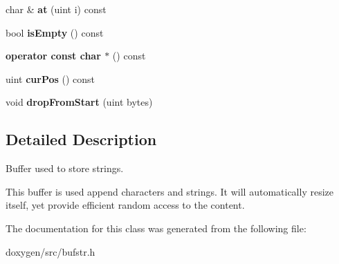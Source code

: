 \begin{DoxyCompactItemize}
char \& {\bfseries at} (uint i) const
\item 
\mbox{\label{class_buf_str_a5dae2d2677e172a6bbe67c3dead0437d}} 
bool {\bfseries is\+Empty} () const
\item 
\mbox{\label{class_buf_str_a9241dfbe73acd385748fe62694ad940b}} 
{\bfseries operator const char $\ast$} () const
\item 
\mbox{\label{class_buf_str_aa9b6a7bdc35082b38465fa56cf2a8906}} 
uint {\bfseries cur\+Pos} () const
\item 
\mbox{\label{class_buf_str_a583b684f2a7ad02fadbe9caef14af656}} 
void {\bfseries drop\+From\+Start} (uint bytes)
\end{DoxyCompactItemize}


\subsection{Detailed Description}
Buffer used to store strings. 

This buffer is used append characters and strings. It will automatically resize itself, yet provide efficient random access to the content. 

The documentation for this class was generated from the following file\+:\begin{DoxyCompactItemize}
\item 
doxygen/src/bufstr.\+h\end{DoxyCompactItemize}
